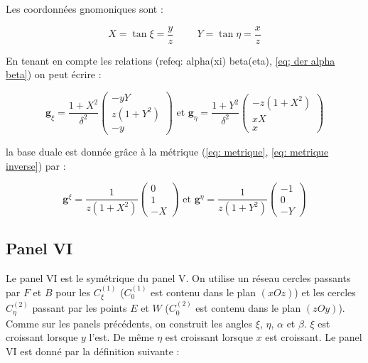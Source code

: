 Les coordonnées gnomoniques sont :

\begin{equation}
X = \tan \xi = \dfrac{y}{z} \hspace{1cm} Y = \tan \eta = \dfrac{x}{z}
\end{equation}

En tenant en compte les relations (ref{eq: alpha(xi) beta(eta)}, \ref{eq; der alpha beta}) on peut écrire : 

\begin{equation}
\mathbf{g}_{\xi} = \dfrac{1+X^2}{\delta^2} \begin{pmatrix}
-yY \\ z(1+Y^2) \\ -y
\end{pmatrix} \text{ et } \mathbf{g}_{\eta} = \dfrac{1+Y^2}{\delta^2} \begin{pmatrix}
-z(1+X^2) \\ xX \\ x
\end{pmatrix}
\label{eq: base locale V}
\end{equation}

la base duale est donnée grâce à la métrique (\ref{eq: metrique}, \ref{eq: metrique inverse}) par :

\begin{equation}
\mathbf{g}^{\xi} = \dfrac{1}{z(1+X^2)}\begin{pmatrix}
0 \\ 1 \\ -X
\end{pmatrix} \text{ et } \mathbf{g}^{\eta} = \dfrac{1}{z(1+Y^2)}\begin{pmatrix}
-1 \\ 0 \\ -Y
\end{pmatrix}
\label{eq: base duale V}
\end{equation}













\subsection{Panel VI}

Le panel VI est le symétrique du panel V. On utilise un réseau cercles passants par $F$ et $B$ pour les $C_{\xi}^{(1)}$ ($C_{0}^{(1)}$ est contenu dans le plan $(xOz)$) et les cercles $C_{\eta}^{(2)}$ passant par les points $E$ et $W$ ($C_{0}^{(2)}$ est contenu dans le plan $(zOy)$). Comme sur les panels précédents, on construit les angles $\xi$, $\eta$, $\alpha$ et $\beta$. $\xi$ est croissant lorsque $y$ l'est. De même $\eta$ est croissant lorsque $x$ est croissant.
Le panel VI est donné par la définition suivante :

